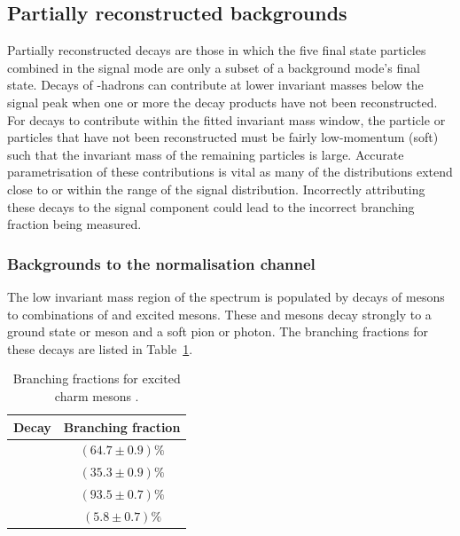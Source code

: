 \subsection{Partially reconstructed backgrounds}
\label{sec:B2DsKK_partrecocomps}

Partially reconstructed decays are those in which the five final state particles combined in the signal mode are only a subset of a background mode's final state.
Decays of \bquark-hadrons can contribute at lower invariant masses below the signal peak when one or more the decay products have not been reconstructed. 
For decays to contribute within the fitted \Bp invariant mass window, the particle or particles that have not been reconstructed must be fairly low-momentum (soft) such that the invariant mass of the remaining particles is large. Accurate parametrisation of these contributions is vital as many of the distributions extend close to or within the range of the signal distribution. Incorrectly attributing these decays to the signal component could lead to the incorrect branching fraction being measured. 

\subsubsection{Backgrounds to the normalisation channel}
\label{sec:B2DsKK_norm_partreco}

The low invariant mass region of the \Dsp\Dzb spectrum is populated by decays of \Bp mesons to combinations of \D and excited \D mesons. These \Dstarzb and \Dss mesons decay strongly to a ground state \Dzb or \Dsp meson and a soft pion or photon. The branching fractions for these decays are listed in Table~\ref{tab:dstar_BFs}.


\begin{table}[h]
\centering
\begin{tabular}{ l c }

\hline
Decay                           & Branching fraction \\ 
\hline
\decay{\Dstarzb}{\Dzb\Pgamma}   &   $(64.7\pm0.9)\%$ \\
\decay{\Dstarzb}{\Dzb\piz}      &   $(35.3\pm0.9)\%$ \\
\decay{\Dssp}{\Dsp\Pgamma}      &   $(93.5\pm0.7)\%$ \\
\decay{\Dssp}{\Dsp\piz}         &    $(5.8\pm0.7)\%$ \\
\hline

\end{tabular}  
\caption{Branching fractions for excited charm mesons \cite{PDG2016}. } 
\label{tab:dstar_BFs}
\end{table}

